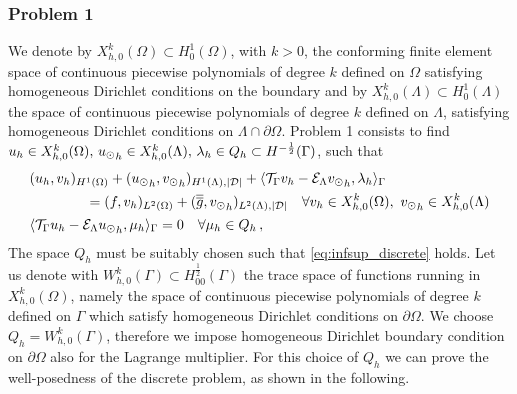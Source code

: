 \subsubsection{Problem 1}
We denote by $X_{h,0}^k(\Omega)\subset H^1_0(\Omega)$, with $k>0$, the conforming finite element space of continuous piecewise polynomials of degree $k$ defined on $\Omega$ satisfying homogeneous Dirichlet conditions on the boundary and by $X_{h,0}^k(\Lambda)\subset H^1_0(\Lambda)$ the space of continuous piecewise polynomials of degree $k$ defined on $\Lambda$, satisfying homogeneous Dirichlet conditions on $\Lambda \cap \partial \Omega$. 
Problem 1 consists to find $u_h \in X_{h,0}^k (\Omega) ,\, {u_{\odot}}_h \in X_{h,0}^k(\Lambda) ,\, \lambda_h \in Q_h \subset H^{-\frac12}(\Gamma )$, such that
\begin{subequations}
\begin{align}
&(u_h,v_h)_{H^1(\Omega)} + ({u_{\odot}}_h,{v_{\odot}}_h)_{H^1(\Lambda),|\mathcal{D}|} 
+ \langle {\mathcal{T}_\Gamma} v_h  - \mathcal{E}_{\Lambda} {v_{\odot}}_h, \lambda_h \rangle_\Gamma 
\\
\nonumber
&\qquad\qquad= (f,v_h)_{L^2(\Omega)} + (\overline{\overline{g}},{v_{\odot}}_h)_{L^2(\Lambda),|\mathcal{D}|}
\quad \forall v_h \in X_{h,0}^k(\Omega), \ {v_{\odot}}_h \in X_{h,0}^k(\Lambda)
\\
&   \langle {\mathcal{T}_\Gamma} u_h - \mathcal{E}_{\Lambda} {u_{\odot}}_h , \mu_h \rangle_\Gamma = 0
\quad \forall \mu_h \in Q_h\,,
\end{align}
\end{subequations}
The space $Q_h$ must be suitably chosen such that \eqref{eq:infsup_discrete} holds. Let us denote with $W_{h,0}^k(\Gamma) \subset H^{\frac 12}_{00}(\Gamma)$ the trace space of functions running in $X_{h,0}^k(\Omega)$, namely the space of continuous piecewise polynomials of degree $k$ defined on $\Gamma$ which satisfy homogeneous Dirichlet conditions on $\partial \Omega$. We choose $Q_h=W_{h,0}^k(\Gamma)$, therefore we impose homogeneous Dirichlet boundary condition on $\partial \Omega$ also for the Lagrange multiplier. For this choice of $Q_h$ we can prove the well-posedness of the discrete problem, as shown in the following. 

